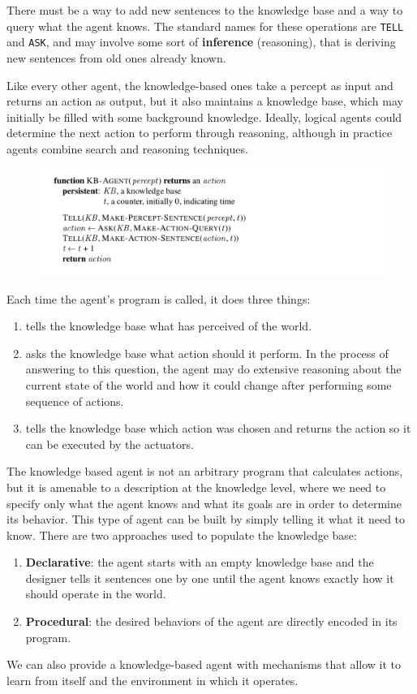 \documentclass{article}
\newcommand{\code}{\lstinline}
\begin{document}
There must be a way to add new sentences to the knowledge base and a way to query what the agent knows. The standard names for these operations are \code{TELL} and \code{ASK}, and may involve some sort of \textbf{inference} (reasoning), that is deriving new sentences from old ones already known.

Like every other agent, the knowledge-based ones take a percept as input and returns an action as output, but it also maintains a knowledge base, which may initially be filled with some background knowledge. Ideally, logical agents could determine the next action to perform through reasoning, although in practice agents combine search and reasoning techniques.

\begin{figure}[h]
    \centering
    \includegraphics[width=1\linewidth]{algorithms/KB Agent.png}
    \label{fig:kb_agent_algorithm}
\end{figure}

\noindent
Each time the agent's program is called, it does three things:
\begin{enumerate}
    \item tells the knowledge base what has perceived of the world.
    \item asks the knowledge base what action should it perform. In the process of answering to this question, the agent may do extensive reasoning about the current state of the world and how it could change after performing some sequence of actions.
    \item tells the knowledge base which action was chosen and returns the action so it can be executed by the actuators.
\end{enumerate}

The knowledge based agent is not an arbitrary program that calculates actions, but it is amenable to a description at the knowledge level, where we need to specify only what the agent knows and what its goals are in order to determine its behavior. This type of agent can be built by simply telling it what it need to know. There are two approaches used to populate the knowledge base:
\begin{enumerate}
    \item \textbf{Declarative}: the agent starts with an empty knowledge base and the designer tells it sentences one by one until the agent knows exactly how it should operate in the world.
    \item \textbf{Procedural}: the desired behaviors of the agent are directly encoded in its program.
\end{enumerate}
We can also provide a knowledge-based agent with mechanisms that allow it to learn from itself and the environment in which it operates.
\end{document}
